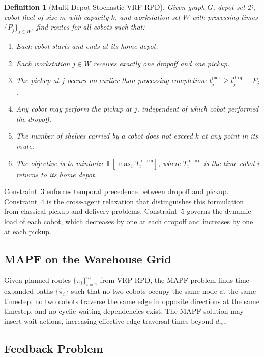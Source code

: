 \documentclass{article}
\newtheorem{definition}{Definition}
\begin{document}
\begin{definition}[Multi-Depot Stochastic VRP-RPD]
Given graph $G$, depot set $\mathcal{D}$, cobot fleet of size $m$ with capacity
$k$, and workstation set $W$ with processing times $\{P_j\}_{j \in W}$, find
routes for all cobots such that:
\begin{enumerate}
    \item Each cobot starts and ends at its home depot.
    \item Each workstation $j \in W$ receives exactly one dropoff and one pickup.
    \item The pickup at $j$ occurs no earlier than processing completion:
    $t_j^{\text{pick}} \geq t_j^{\text{drop}} + P_j$.
    \item Any cobot may perform the pickup at $j$, independent of which cobot
    performed the dropoff.
    \item The number of shelves carried by a cobot does not exceed $k$ at any
    point in its route.
    \item The objective is to minimize $\mathbb{E}[\max_i T_i^{\text{return}}]$,
    where $T_i^{\text{return}}$ is the time cobot $i$ returns to its home depot.
\end{enumerate}
\end{definition}

Constraint~3 enforces temporal precedence between dropoff and pickup. Constraint~4
is the cross-agent relaxation that distinguishes this formulation from classical
pickup-and-delivery problems. Constraint~5 governs the dynamic load of each
cobot, which decreases by one at each dropoff and increases by one at each
pickup.

\subsection{MAPF on the Warehouse Grid}

Given planned routes $\{\pi_i\}_{i=1}^m$ from VRP-RPD, the MAPF problem finds
time-expanded paths $\{\hat{\pi}_i\}$ such that no two cobots occupy the same
node at the same timestep, no two cobots traverse the same edge in opposite
directions at the same timestep, and no cyclic waiting dependencies exist. The
MAPF solution may insert wait actions, increasing effective edge traversal times
beyond $d_{uv}$.

\subsection{Feedback Problem}
\end{document}
